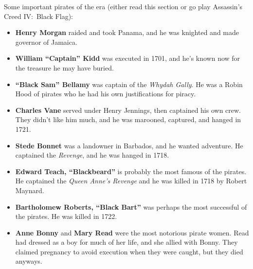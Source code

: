 Some important pirates of the era (either read this section or go play Assassin's Creed IV:\ Black Flag):

\begin{itemize}
  \item
    \textbf{Henry Morgan} raided and took Panama, and he was knighted and made governor of Jamaica.

  \item
    \textbf{William ``Captain'' Kidd} was executed in 1701,
    and he's known now for the treasure he may have buried.

  \item
    \textbf{``Black Sam'' Bellamy} was captain of the \textit{Whydah Gally}.
    He was a Robin Hood of pirates who he had his own justifications for piracy.

  \item
    \textbf{Charles Vane} served under Henry Jennings, then captained his own crew.
    They didn't like him much, and he was marooned, captured, and hanged in 1721.

  \item
    \textbf{Stede Bonnet} was a landowner in Barbados, and he wanted adventure.
    He captained the \textit{Revenge}, and he was hanged in 1718.

  \item
    \textbf{Edward Teach, ``Blackbeard''} is probably the most famous of the pirates.
    He captained the \textit{Queen Anne's Revenge} and he was killed in 1718 by Robert Maynard.

  \item
    \textbf{Bartholomew Roberts, ``Black Bart''} was perhaps the most successful of the pirates.
    He was killed in 1722.

  \item
    \textbf{Anne Bonny} and \textbf{Mary Read} were the most notorious pirate women.
    Read had dressed as a boy for much of her life, and she allied with Bonny.
    They claimed pregnancy to avoid execution when they were caught, but they died anyways.
\end{itemize}
